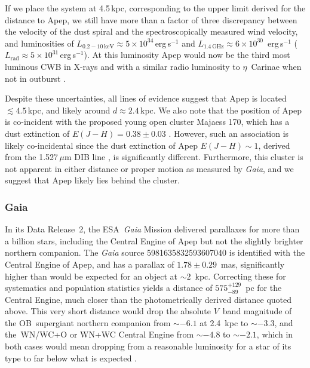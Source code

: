 \documentclass[preprint,times]{aastex61}
\begin{document}
If we place the system at 4.5\,kpc, corresponding to the upper limit derived for the distance to Apep, we still have more than a factor of three discrepancy between the velocity of the dust spiral and the spectroscopically measured wind velocity, and luminosities of $L_{0.2-10\,\mathrm{keV}} \approx 5 \times 10^{34}$\,erg\,s$^{-1}$ and $ L_{1.4\,\mathrm{GHz}} \approx 6 \times 10^{30}$ \,erg\,s$^{-1}$ ($L_{\mathrm{rad}} \approx 5 \times 10^{31}$\,erg\,s$^{-1}$). At this luminosity Apep would now be the third most luminous CWB in X-rays \citep{2018MNRAS.474.3228P} and with a similar radio luminosity to $\eta$~Carinae when not in outburst \citep{2013A&A...558A..28D}.

Despite these uncertainties, all lines of evidence suggest that Apep is located $\lesssim 4.5$\,kpc, and likely around $d \approx 2.4$\,kpc. We also note that the position of Apep is co-incident with the proposed young open cluster Majaess 170, which has a dust extinction of $E(J - H) = 0.38 \pm 0.03$ \cite{2013Ap&SS.344..175M,2017MNRAS.464.1119C}. However, such an association is likely co-incidental since the dust extinction of Apep  $E(J - H) \sim 1$, derived from the 1.527\,$\mu$m DIB line \cite{2016MNRAS.463.2653D}, is significantly different. Furthermore, this cluster is not apparent in either distance or proper motion as measured by \emph{Gaia}\citep{2016A&A...595A...2G,BailerJones18}, and we suggest that Apep likely lies behind the cluster. 

\subsubsection{Gaia}

In its Data Release~2, the ESA~\emph{Gaia} Mission \citep{2016A&A...595A...2G}  delivered parallaxes for more than a billion stars, including the Central Engine of Apep but not the slightly brighter northern companion. The \emph{Gaia} source 5981635832593607040 is identified with the Central Engine of Apep, and has a parallax of $1.78 \pm 0.29$~mas, significantly higher than would be expected for an object at $\sim 2$~kpc. Correcting these for systematics and population statistics\citep{BailerJones18} yields a distance of $575_{-89}^{+129}$~pc for the Central Engine, much closer than the photometrically derived distance quoted above. This very short distance would drop the absolute $V$~band magnitude of the OB~supergiant northern companion from $\sim -6.1$ at 2.4~kpc to $\sim -3.3$, and the~WN/WC+O or WN+WC Central Engine from $\sim -4.8$ to $\sim -2.1$, which in both cases would mean dropping from a reasonable luminosity for a star of its type to far below what is expected \cite{2015MNRAS.447.2322R}.
\end{document}
